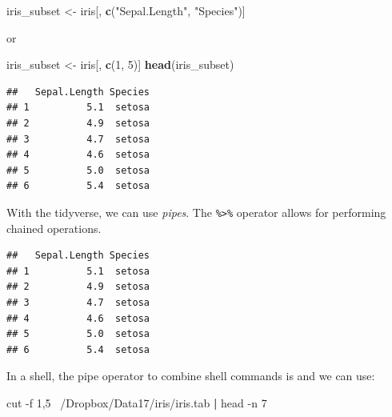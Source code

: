 \documentclass[]{book}
\newenvironment{Shaded}{\begin{snugshade}}{\end{snugshade}}
\newcommand{\KeywordTok}[1]{\textcolor[rgb]{0.13,0.29,0.53}{\textbf{#1}}}
\newcommand{\DecValTok}[1]{\textcolor[rgb]{0.00,0.00,0.81}{#1}}
\newcommand{\StringTok}[1]{\textcolor[rgb]{0.31,0.60,0.02}{#1}}
\newcommand{\FunctionTok}[1]{\textcolor[rgb]{0.00,0.00,0.00}{#1}}
\newcommand{\OperatorTok}[1]{\textcolor[rgb]{0.81,0.36,0.00}{\textbf{#1}}}
\newcommand{\NormalTok}[1]{#1}
\theoremstyle{definition}
\theoremstyle{definition}
\theoremstyle{definition}
\theoremstyle{remark}
\begin{document}
\begin{Shaded}
\begin{Highlighting}[]
\NormalTok{iris_subset <-}\StringTok{ }\NormalTok{iris[, }\KeywordTok{c}\NormalTok{(}\StringTok{"Sepal.Length"}\NormalTok{, }\StringTok{"Species"}\NormalTok{)]}
\end{Highlighting}
\end{Shaded}

or

\begin{Shaded}
\begin{Highlighting}[]
\NormalTok{iris_subset <-}\StringTok{ }\NormalTok{iris[, }\KeywordTok{c}\NormalTok{(}\DecValTok{1}\NormalTok{, }\DecValTok{5}\NormalTok{)]}
\KeywordTok{head}\NormalTok{(iris_subset)}
\end{Highlighting}
\end{Shaded}

\begin{verbatim}
##   Sepal.Length Species
## 1          5.1  setosa
## 2          4.9  setosa
## 3          4.7  setosa
## 4          4.6  setosa
## 5          5.0  setosa
## 6          5.4  setosa
\end{verbatim}

With the tidyverse, we can use \emph{pipes}. The
\texttt{\%\textgreater{}\%} operator allows for performing chained
operations.

\begin{Shaded}
\end{Shaded}

\begin{verbatim}
##   Sepal.Length Species
## 1          5.1  setosa
## 2          4.9  setosa
## 3          4.7  setosa
## 4          4.6  setosa
## 5          5.0  setosa
## 6          5.4  setosa
\end{verbatim}

In a shell, the pipe operator to combine shell commands is
\texttt{\textbar{}} and we can use:

\begin{Shaded}
\begin{Highlighting}[]
\FunctionTok{cut}\NormalTok{ -f 1,5 ~/Dropbox/Data17/iris/iris.tab }\KeywordTok{|} \FunctionTok{head}\NormalTok{ -n 7}
\end{Highlighting}
\end{Shaded}
\end{document}
